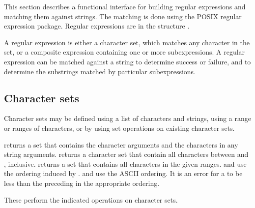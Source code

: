 This section describes a functional interface for building regular
 expressions and matching them against strings.
The matching is done using the POSIX regular expression package.
Regular expressions are in the structure .

A regular expression is either a character set, which matches any character
in the set, or a composite expression containing one or more subexpressions.
A regular expression can be matched against a string to determine success
or failure, and to determine the substrings matched by particular subexpressions.

\subsection{Character sets}

Character sets may be defined using a list of characters and strings,
using a range or ranges of characters, or by using set operations on
existing character sets.

\begin{protos}
\end{protos}
\noindent
{} returns a set that contains the character arguments and the
characters in any string arguments.   returns a character
set that contain all characters between  and ,
inclusive.   returns a set that contains all characters in
the given ranges.   and  use the ordering induced by
.   and  use the
 ASCII ordering.
It is an error for a  to be less than the preceding
  in the appropriate ordering.

\begin{protos}
\end{protos}
\noindent
These perform the indicated operations on character sets.

